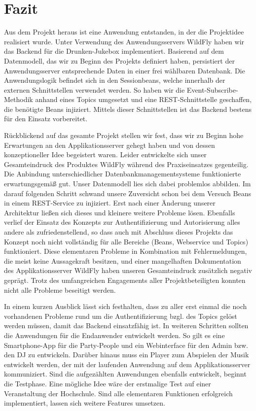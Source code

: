 \newpage
\section{Fazit}
Aus dem Projekt heraus ist eine Anwendung entstanden, in der die Projektidee realisiert wurde. Unter Verwendung des Anwendungsservers WildFly haben wir das Backend für die Drunken-Jukebox implementiert.
Basierend auf dem Datenmodell, das wir zu Beginn des Projekts definiert haben, persistiert der Anwendungsserver entsprechende Daten in einer frei wählbaren Datenbank. Die Anwendungslogik befindet sich in den Sessionbeans, welche innerhalb der externen Schnittstellen verwendet werden. So haben wir die Event-Subscribe-Methodik anhand eines Topics umgesetzt und eine REST-Schnittstelle geschaffen, die benötigte Beans injiziert. Mittels dieser Schnittstellen ist das Backend bestens für den Einsatz vorbereitet. 

Rückblickend auf das gesamte Projekt stellen wir fest, dass wir zu Beginn hohe Erwartungen an den Applikationsserver gehegt haben und von dessen konzeptioneller Idee begeistert waren. Leider entwickelte sich unser Gesamteindruck des Produktes WildFly während des Praxiseinsatzes gegenteilig. 
Die Anbindung unterschiedlicher Datenbankmanagementsysteme funktionierte erwartungsgemäß gut. Unser Datenmodell lies sich dabei problemlos abbilden. Im darauf folgenden Schritt schwand unsere Zuversicht schon bei dem Versuch Beans in einem REST-Service zu injiziert. Erst nach einer Änderung unserer Architektur ließen sich dieses und kleinere weitere Probleme lösen. Ebenfalls verlief der Einsatz des Konzepts zur Authentifizierung und Autorisierung alles andere als zufriedenstellend, so dass auch mit Abschluss dieses Projekts das Konzept noch nicht vollständig für alle Bereiche (Beans, Webservice und Topics) funktioniert.
Diese elementaren Probleme in Kombination mit Fehlermeldungen, die meist keine Aussagekraft besitzen, und einer mangelhaften Dokumentation des Applikationsserver WildFly haben unseren Gesamteindruck zusätzlich negativ geprägt. Trotz des umfangreichen Engagements aller Projektbeteiligten konnten nicht alle Probleme beseitigt werden.

In einem kurzen Ausblick lässt sich festhalten, dass zu aller erst einmal die noch vorhandenen Probleme rund um die Authentifizierung bzgl. des Topics gelöst werden müssen, damit das Backend einsatzfähig ist. In weiteren Schritten sollten die Anwendungen für die Endanwender entwickelt werden. So gilt es eine Smartphone-App für die Party-People und ein Webinterface für den Admin bzw. den DJ zu entwickeln. Darüber hinaus muss ein Player zum Abspielen der Musik entwickelt werden, der mit der laufenden Anwendung auf dem Applikationsserver kommuniziert.
Sind die aufgezählten Anwendungen ebenfalls entwickelt, beginnt die Testphase. Eine mögliche Idee wäre der erstmalige Test auf einer Veranstaltung der Hochschule. Sind alle elementaren Funktionen erfolgreich implementiert, lassen sich weitere Features umsetzen.